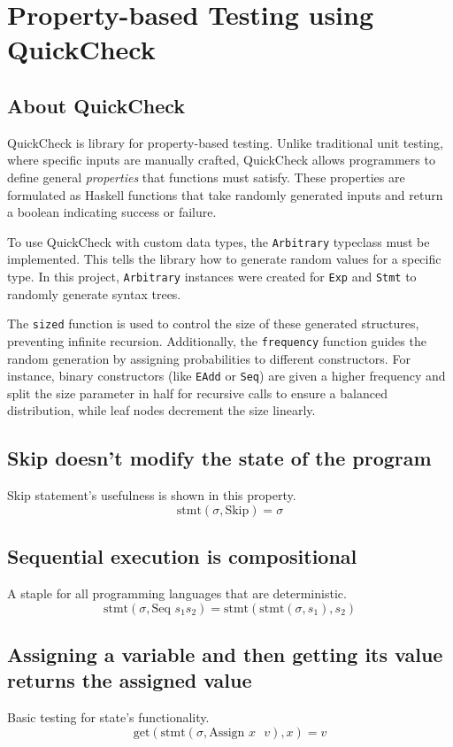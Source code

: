 \documentclass{article}
\begin{document}
	\section{Property-based Testing using QuickCheck}
	\subsection{About QuickCheck}
	QuickCheck is library for property-based testing. Unlike traditional unit testing, where specific inputs are manually crafted, QuickCheck allows programmers to define general \textit{properties} that functions must satisfy. These properties are formulated as Haskell functions that take randomly generated inputs and return a boolean indicating success or failure.
	
	To use QuickCheck with custom data types, the \texttt{Arbitrary} typeclass must be implemented. This tells the library how to generate random values for a specific type. In this project, \texttt{Arbitrary} instances were created for \texttt{Exp} and \texttt{Stmt} to randomly generate syntax trees. 
	
	The \texttt{sized} function is used to control the size of these generated structures, preventing infinite recursion. Additionally, the \texttt{frequency} function guides the random generation by assigning probabilities to different constructors. For instance, binary constructors (like \texttt{EAdd} or \texttt{Seq}) are given a higher frequency and split the size parameter in half for recursive calls to ensure a balanced distribution, while leaf nodes decrement the size linearly.
	\subsection{Skip doesn't modify the state of the program}
	Skip statement's usefulness is shown in this property. 
	\[
	\text{stmt}(\sigma, \text{Skip}) = \sigma
	\]
	\subsection{Sequential execution is compositional}
	A staple for all programming languages that are deterministic.
	\[
	\text{stmt}(\sigma, \text{Seq } s_1 s_2) = \text{stmt}(\text{stmt}(\sigma, s_1), s_2)
	\]
	\subsection{Assigning a variable and then getting its value returns the assigned value}
	Basic testing for state's functionality.
	\[
	\text{get}(\text{stmt}(\sigma, \text{Assign }x \text{ } v), x) = v
	\]
\end{document}
